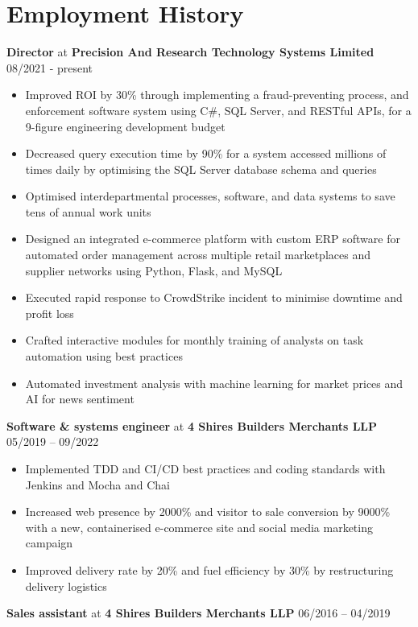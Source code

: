\documentclass[10pt,a4paper]{article}
\begin{document}
\section*{Employment History}\vspace{-\baselineskip}\medskip
\textbf{Director} at \textbf{Precision And Research Technology Systems Limited} \hfill 08/2021 - present\vspace{-\baselineskip}\medskip
\begin{itemize}[noitemsep]
   \item Improved ROI by 30\% through implementing a fraud-preventing process, and enforcement software system using C\#, SQL Server, and RESTful APIs, for a 9-figure engineering development budget
   \item Decreased query execution time by 90\% for a system accessed millions of times daily by optimising the SQL Server database schema and queries
   \item Optimised interdepartmental processes, software, and data systems to save tens of annual work units
   \item Designed an integrated e-commerce platform with custom ERP software for automated order management across multiple retail marketplaces and supplier networks using Python, Flask, and MySQL
   \item Executed rapid response to CrowdStrike incident to minimise downtime and profit loss
   \item Crafted interactive modules for monthly training of analysts on task automation using best practices
   \item Automated investment analysis with machine learning for market prices and AI for news sentiment
\end{itemize}
\textbf{Software \& systems engineer} at \textbf{4 Shires Builders Merchants LLP} \hfill 05/2019 -- 09/2022\vspace{-\baselineskip}\medskip
\begin{itemize}[noitemsep]
   \item Implemented TDD and CI/CD best practices and coding standards with Jenkins and Mocha and Chai
   \item Increased web presence by 2000\% and visitor to sale conversion by 9000\% with a new, containerised e-commerce site and social media marketing campaign
   \item Improved delivery rate by 20\% and fuel efficiency by 30\% by restructuring delivery logistics
\end{itemize}
\textbf{Sales assistant} at \textbf{4 Shires Builders Merchants LLP} \hfill 06/2016 -- 04/2019\vspace{-\baselineskip}\medskip
\end{document}
